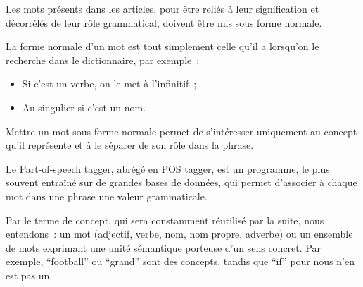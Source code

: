 \documentclass[a4paper, 12pt]{article}
\begin{document}
Les mots présents dans les articles, pour être reliés à leur signification et décorrélés de leur rôle grammatical, doivent être mis sous forme normale.

\begin{definition}
La forme normale d'un mot est tout simplement celle qu'il a lorsqu'on le recherche dans le dictionnaire, par exemple~:
\begin{itemize}
 \item Si c'est un verbe, on le met à l'infinitif~;
 \item Au singulier si c'est un nom.
\end{itemize}
Mettre un mot sous forme normale permet de s'intéresser uniquement au concept qu'il représente et à le séparer de son rôle dans la phrase.
\end{definition}


\begin{definition}
Le Part-of-speech tagger, abrégé en POS tagger, est un programme, le plus souvent entraîné sur de grandes bases de données, qui permet d'associer à chaque mot dans une phrase une valeur grammaticale.
\end{definition}

\begin{definition}[Concept]
Par le terme de concept, qui sera constamment réutilisé par la suite, nous entendons~: un mot (adjectif, verbe, nom, nom propre, adverbe) ou un ensemble de mots exprimant une unité sémantique porteuse d'un sens concret. Par exemple, ``football'' ou ``grand'' sont des concepts, tandis que ``if'' pour nous n'en est pas un.
\end{definition}
\end{document}
